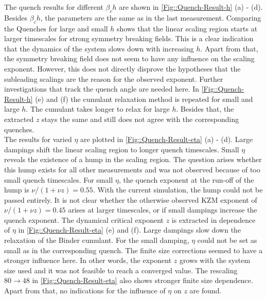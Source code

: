 	The quench results for different $\beta_c h$ are shown in \autoref{Fig::Quench-Result-h} (a) - (d). Besides $\beta_c h$, the parameters are the same as in the last measurement. Comparing the Quenches for large and small $h$ shows that the linear scaling region starts at larger timescales for strong symmetry breaking fields. This is a clear indication that the dynamics of the system slows down with increasing $h$. Apart from that, the symmetry breaking field does not seem to have any influence on the scaling exponent. However, this does not directly disprove the hypotheses that the subleading scalings are the reason for the observed exponent. Further investigations that track the quench angle are needed here. In \autoref{Fig::Quench-Result-h} (e) and (f) the cumulant relaxation method is repeated for small and large $h$. The cumulant takes longer to relax for large $h$. Besides that, the extracted $z$ stays the same and still does not agree with the corresponding quenches.\\
	
	The results for varied $\eta$ are plotted in \autoref{Fig::Quench-Result-eta} (a) - (d). Large dampings shift the linear scaling region to longer quench timescales. Small $\eta$ reveals the existence of a hump in the scaling region. The question arises whether this hump exists for all other measurements and was not observed because of too small quench timescales. For small $\eta$, the quench exponent at the run-off of the hump is $\nu /	(1 + \nu z) =	0.55$. With the current simulation, the hump could not be passed entirely. It is not clear whether the otherwise observed KZM exponent of $\nu /	(1 + \nu z) =	0.45$ arises at larger timescales, or if small dampings increase the quench exponent. The dynamical critical exponent $z$ is extracted in dependence of $\eta$ in \autoref{Fig::Quench-Result-eta} (e) and (f). Large dampings slow down the relaxation of the Binder cumulant. For the small damping, $\eta$ could not be set as small as in the corresponding quench. The finite size corrections seemed to have a stronger influence here. In other words, the exponent $z$ grows with the system size used and it was not feasible to reach a converged value. The rescaling $80 \rightarrow 48$ in \autoref{Fig::Quench-Result-eta} also shows stronger finite size dependence. Apart from that, no indications for the influence of $\eta$ on $z$ are found.\\
	

